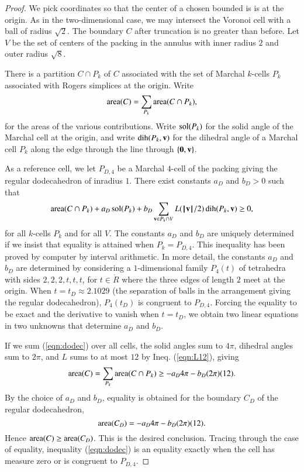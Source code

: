 \documentclass{llncs}
\def\area{\op{area}}
\begin{document}
\begin{proof}
We pick coordinates so that the center of a chosen bounded is is at the origin.
As in the two-dimensional case, we may intersect the Voronoi cell with a ball of radius
$\sqrt2$.  The  boundary $C$ after truncation is no greater than before.
Let $V$ be the set of centers of the packing in the annulus with inner radius $2$ and
outer radius $\sqrt8$.

There is a partition $C\cap P_k$ of  $C$ associated with the set of
Marchal $k$-cells $P_k$ associated with  Rogers simplices at the origin. 
Write 
\[
\area(C) = \sum_{P_k} \area(C\cap P_k),
\]
for the areas of the various contributions.
Write $\operatorname{sol}(P_k)$ for the solid angle of the Marchal cell at the origin, and write
$\operatorname{dih}(P_k,{\mathbf v})$ for the dihedral angle of a Marchal cell $P_k$ along the edge through
the line through $\{{\mathbf 0},{\mathbf v}\}$.  

As a reference cell, we let $P_{D,4}$ be a Marchal $4$-cell of the packing giving the
regular dodecahedron
of inradius $1$.  There exist constants $a_D$ and $b_D>0$ such
that
\begin{equation}\label{eqn:dodec}
\area(C\cap P_k) +  a_D \sol(P_k) + b_D \sum_{\v\in P_k\cap V} L(\normo{\v}/2)\dih(P_k,\v) \ge0,
\end{equation}
for all $k$-cells $P_k$ and for all $V$.  The constants $a_D$ and
$b_D$ are uniquely determined if we insist that equality is attained
when $P_k = P_{D,4}$.  This inequality has been proved by computer by
interval arithmetic.  In more detail, the constants $a_D$ and $b_D$
are determined by considering a $1$-dimensional family $P_4(t)$ of
tetrahedra with sides $2,2,2,t,t,t$, for $t\in \ring{R}$ where the
three edges of length $2$ meet at the origin.  When $t=t_D\approx
2.1029$ (the separation of balls in the arrangement giving the regular
dodecahedron), $P_4(t_D)$ is congruent to $P_{D,4}$.  Forcing the
equality to be exact and the derivative to vanish when $t=t_D$, we
obtain two linear equations in two unknowns that determine $a_D$ and
$b_D$.

If we sum (\ref{eqn:dodec}) over all cells, the solid angles sum to $4\pi$, dihedral
angles sum to $2\pi$, and $L$ sums to at most $12$ by Ineq. (\ref{eqn:L12}), giving
\[
\area(C) = \sum_{P_k}\area(C\cap P_k) \ge -a_D 4\pi - b_D (2\pi) (12).
\]
By the choice of $a_D$ and $b_D$, equality is obtained for the boundary
$C_D$ of the regular dodecahedron, 
\[
\area(C_D) = -a_D 4\pi - b_D (2\pi) (12).
\]
Hence $\area(C)\ge \area(C_D)$. This is the desired conclusion.  Tracing through
the case of equality, inequality (\ref{eqn:dodec}) is an equality exactly when the cell
has measure zero or is congruent to $P_{D,4}$.
\end{proof}
\end{document}
